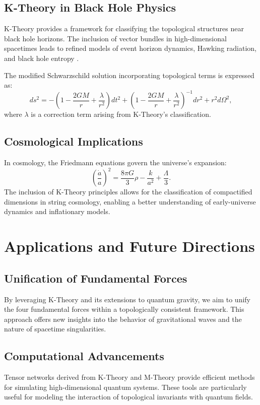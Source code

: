 \documentclass{article}
\theoremstyle{plain}
\begin{document}
\subsection{K-Theory in Black Hole Physics}
K-Theory provides a framework for classifying the topological structures near black hole horizons. The inclusion of vector bundles in high-dimensional spacetimes leads to refined models of event horizon dynamics, Hawking radiation, and black hole entropy \cite{bekenstein1973entropy}.

The modified Schwarzschild solution incorporating topological terms is expressed as:
\begin{equation}
ds^2 = -\left(1 - \frac{2GM}{r} + \frac{\lambda}{r^2}\right)dt^2 + \left(1 - \frac{2GM}{r} + \frac{\lambda}{r^2}\right)^{-1}dr^2 + r^2d\Omega^2,
\end{equation}
where $\lambda$ is a correction term arising from K-Theory's classification.

\subsection{Cosmological Implications}
In cosmology, the Friedmann equations govern the universe's expansion:
\begin{equation}
\left(\frac{\dot{a}}{a}\right)^2 = \frac{8\pi G}{3}\rho - \frac{k}{a^2} + \frac{\Lambda}{3}.
\end{equation}
The inclusion of K-Theory principles allows for the classification of compactified dimensions in string cosmology, enabling a better understanding of early-universe dynamics and inflationary models.

\section{Applications and Future Directions}
\subsection{Unification of Fundamental Forces}
By leveraging K-Theory and its extensions to quantum gravity, we aim to unify the four fundamental forces within a topologically consistent framework. This approach offers new insights into the behavior of gravitational waves and the nature of spacetime singularities.

\subsection{Computational Advancements}
Tensor networks derived from K-Theory and M-Theory provide efficient methods for simulating high-dimensional quantum systems. These tools are particularly useful for modeling the interaction of topological invariants with quantum fields.
\end{document}
